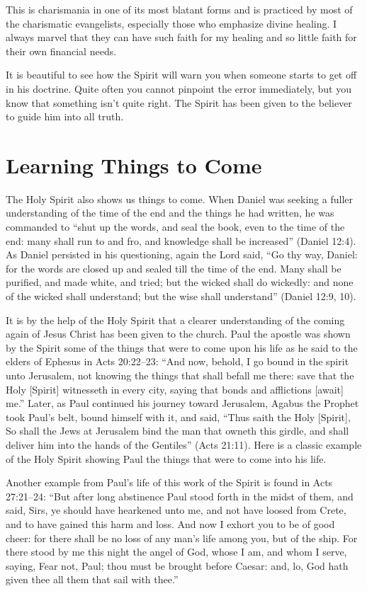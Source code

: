 This is charismania in one of its most blatant forms and
is practiced by most of the charismatic evangelists, especially
those who emphasize divine healing. I always marvel
that they can have such faith for my healing and so little
faith for their own financial needs.

It is beautiful to see how the Spirit will warn you when
someone starts to get off in his doctrine. Quite often you
cannot pinpoint the error immediately, but you know that
something isn’t quite right. The Spirit has been given to the
believer to guide him into all truth.


\section*{Learning Things to Come}

The Holy Spirit also shows us things to come. When
Daniel was seeking a fuller understanding of the time of the
end and the things he had written, he was commanded to
“shut up the words, and seal the book, even to the time of
the end: many shall run to and fro, and knowledge shall
be increased” (Daniel 12:4). As Daniel persisted in his questioning,
again the Lord said, “Go thy way, Daniel: for the
words are closed up and sealed till the time of the end.
Many shall be purified, and made white, and tried; but
the wicked shall do wickedly: and none of the wicked
shall understand; but the wise shall understand” (Daniel
12:9, 10).

It is by the help of the Holy Spirit that a clearer understanding
of the coming again of Jesus Christ has been given
to the church. Paul the apostle was shown by the Spirit
some of the things that were to come upon his life as he said
to the elders of Ephesus in Acts 20:22–23: “And now, behold,
I go bound in the spirit unto Jerusalem, not knowing the
things that shall befall me there: save that the Holy [Spirit]
witnesseth in every city, saying that bonds and afflictions
[await] me.” Later, as Paul continued his journey toward
Jerusalem, Agabus the Prophet took Paul’s belt, bound himself
with it, and said, “Thus saith the Holy [Spirit], So shall
the Jews at Jerusalem bind the man that owneth this girdle,
and shall deliver him into the hands of the Gentiles” (Acts
21:11). Here is a classic example of the Holy Spirit showing
Paul the things that were to come into his life.

Another example from Paul’s life of this work of the
Spirit is found in Acts 27:21–24: “But after long abstinence
Paul stood forth in the midst of them, and said, Sirs, ye
should have hearkened unto me, and not have loosed from
Crete, and to have gained this harm and loss. And now I
exhort you to be of good cheer: for there shall be no loss of
any man’s life among you, but of the ship. For there stood
by me this night the angel of God, whose I am, and whom
I serve, saying, Fear not, Paul; thou must be brought before
Caesar: and, lo, God hath given thee all them that sail with
thee.”



